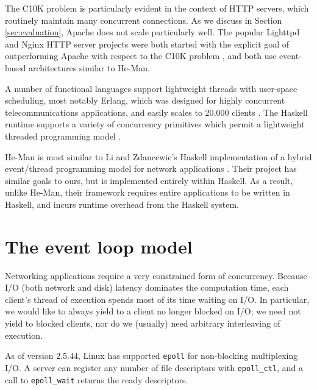 \documentclass[preprint]{sigplanconf}
\renewcommand{\t}{\texttt}
\begin{document}
The C10K problem is particularly evident in the context of HTTP servers, which
routinely maintain many concurrent connections. As we discuss in Section
\ref{sec:evaluation}, Apache does not scale particularly well. The popular
Lighttpd and Nginx HTTP server projects were both started with the explicit goal
of outperforming Apache with respect to the C10K problem \cite{Lighttpd,Nginx},
and both use event-based architectures similar to He-Man. 

A number of functional languages support lightweight threads with user-space
scheduling, most notably Erlang, which was designed for highly concurrent
telecommunications applications, and easily scales to 20,000 clients
\cite{Hellstrom}. The Haskell runtime supports a variety of concurrency
primitives which permit a lightweight threaded programming model \cite{LiEtAl}.


He-Man is most similar to Li and Zdancewic's Haskell implementation of a hybrid
event/thread programming model for network applications \cite{LiZdancewic}.
Their project has similar goals to ours, but is implemented entirely within
Haskell. As a result, unlike He-Man, their framework requires entire
applications to be written in Haskell, and incurs runtime overhead from the
Haskell system.

\section{The event loop model}

Networking applications require a very constrained form of
concurrency. Because I/O (both network and disk) latency dominates the
computation time, each client's thread of execution spends most of its
time waiting on I/O. In particular, we would like to always yield to a
client no longer blocked on I/O; we need not yield to blocked clients,
nor do we (usually) need arbitrary interleaving of execution.

As of version 2.5.44, Linux has supported \t{epoll} for non-blocking
multiplexing I/O. A server can register any number of file descriptors with
\t{epoll\_ctl}, and a call to \t{epoll\_wait} returns the ready descriptors. 
\end{document}
